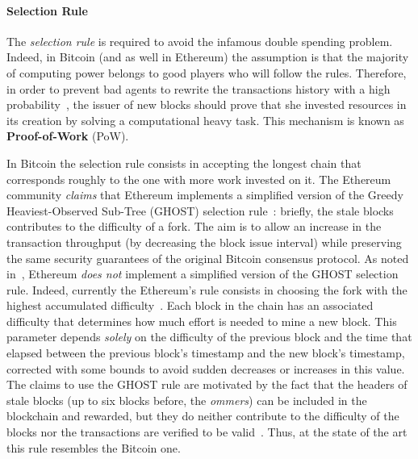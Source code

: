 \paragraph{Selection Rule}
The \emph{selection rule} is required to avoid the infamous double spending
problem. Indeed, in Bitcoin (and as well in Ethereum) the assumption is that the
majority of computing power belongs to good players who will follow the rules.
Therefore, in order to prevent bad agents to rewrite the transactions history
with a high probability~\cite{bib:bitcoin}, the issuer of new blocks should
prove that she invested resources in its creation by solving a computational
heavy task. This mechanism is known as \textbf{Proof-of-Work} (PoW).



In Bitcoin the selection rule consists in accepting the longest chain that
corresponds roughly to the one with more work invested on it. The Ethereum
community \emph{claims} that Ethereum implements a simplified version of the
Greedy Heaviest-Observed Sub-Tree (GHOST) selection
rule~\cite{wood2018ethereum}: briefly, the stale blocks contributes to the
difficulty of a fork. The aim is to allow an increase in the transaction
throughput (by decreasing the block issue interval) while preserving the same
security guarantees of the original Bitcoin consensus protocol. As noted
in~\cite{bib:securityAndScalabilityPoW}, Ethereum \emph{does not} implement a
simplified version of the GHOST selection rule. Indeed, currently the Ethereum's
rule consists in choosing the fork with the highest accumulated
difficulty~\cite{wood2018ethereum}. Each block in the chain has an associated
difficulty that determines how much effort is needed to mine a new block. This
parameter depends \emph{solely} on the difficulty of the previous block and the
time that elapsed between the previous block's timestamp and the new block's
timestamp, corrected with some bounds to avoid sudden decreases or increases in
this value. The claims to use the GHOST rule are motivated by the fact that the
headers of stale blocks (up to six blocks before, the \emph{ommers}) can be
included in the blockchain and rewarded, but they do neither contribute to the
difficulty of the blocks nor the transactions are verified to be
valid~\cite{bib:securityAndScalabilityPoW}. Thus, at the state of the art this
rule resembles the Bitcoin one.





